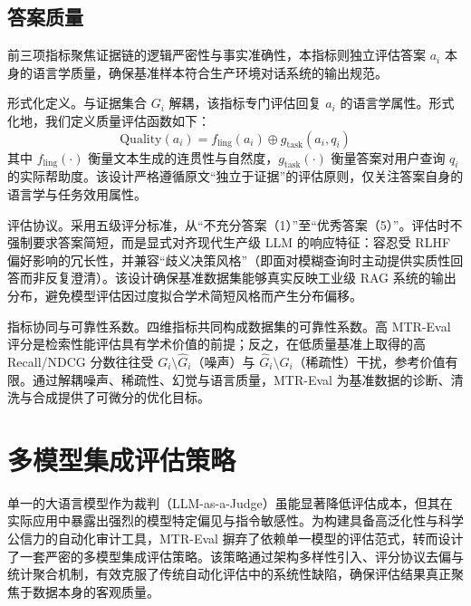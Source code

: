 \subsection{答案质量}



前三项指标聚焦证据链的逻辑严密性与事实准确性，本指标则独立评估答案 $a_i$ 本身的语言学质量，确保基准样本符合生产环境对话系统的输出规范。



形式化定义。与证据集合 $G_i$ 解耦，该指标专门评估回复 $a_i$ 的语言学属性。形式化地，我们定义质量评估函数如下：
\begin{equation}
    \text{Quality}(a_i) = f_{\text{ling}}(a_i) \oplus g_{\text{task}}(a_i, q_i)
\end{equation}
其中 $f_{\text{ling}}(\cdot)$ 衡量文本生成的连贯性与自然度，$g_{\text{task}}(\cdot)$ 衡量答案对用户查询 $q_i$ 的实际帮助度。该设计严格遵循原文“独立于证据”的评估原则，仅关注答案自身的语言学与任务效用属性。



评估协议。采用五级评分标准，从“不充分答案（1）”至“优秀答案（5）”。评估时不强制要求答案简短，而是显式对齐现代生产级 LLM 的响应特征：容忍受 RLHF 偏好影响的冗长性，并兼容“歧义决策风格”（即面对模糊查询时主动提供实质性回答而非反复澄清）。该设计确保基准数据集能够真实反映工业级 RAG 系统的输出分布，避免模型评估因过度拟合学术简短风格而产生分布偏移。



指标协同与可靠性系数。四维指标共同构成数据集的可靠性系数。高 MTR-Eval 评分是检索性能评估具有学术价值的前提；反之，在低质量基准上取得的高 Recall/NDCG 分数往往受 $G_i \setminus \hat{G}_i$（噪声）与 $\hat{G}_i \setminus G_i$（稀疏性）干扰，参考价值有限。通过解耦噪声、稀疏性、幻觉与语言质量，MTR-Eval 为基准数据的诊断、清洗与合成提供了可微分的优化目标。





\section{多模型集成评估策略}

\label{sec:ensemble_strategy}



单一的大语言模型作为裁判（LLM-as-a-Judge）虽能显著降低评估成本，但其在实际应用中暴露出强烈的模型特定偏见与指令敏感性。为构建具备高泛化性与科学公信力的自动化审计工具，MTR-Eval 摒弃了依赖单一模型的评估范式，转而设计了一套严密的多模型集成评估策略。该策略通过架构多样性引入、评分协议去偏与统计聚合机制，有效克服了传统自动化评估中的系统性缺陷，确保评估结果真正聚焦于数据本身的客观质量。




